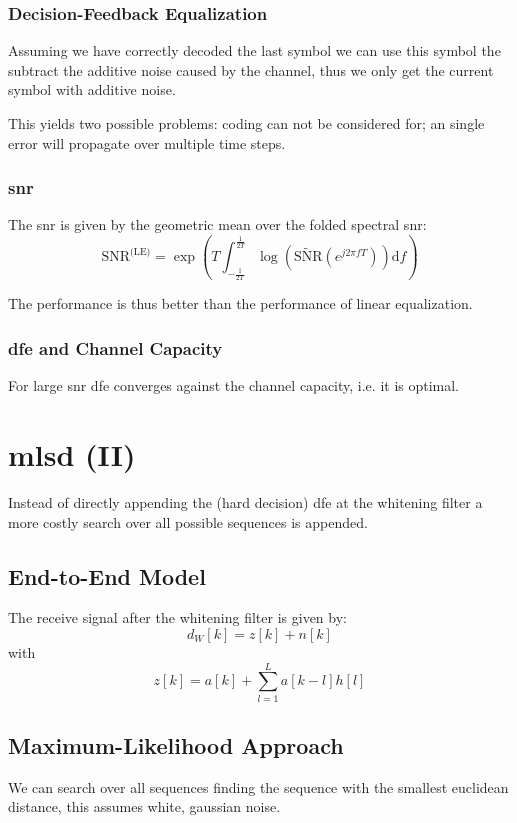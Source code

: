 \subsubsection{Decision-Feedback Equalization}
Assuming we have correctly decoded the last symbol we can use this symbol the subtract
the additive noise caused by the channel, thus we only get the current symbol with additive
noise.

This yields two possible problems: coding can not be considered for; an single error
will propagate over multiple time steps.

\subsubsection{\acl{snr}}
The \ac{snr} is given by the geometric mean over the folded spectral \ac{snr}:
\begin{equation}
    \text{SNR}^\text{(LE)} = \exp\left( T \int_{-\frac{1}{2T}}^\frac{1}{2T} \log \left(
        \tilde{\text{SNR}}(e^{j 2 \pi f T})\right) \text{d}f\right)
\end{equation}

The performance is thus better than the performance of linear equalization.

\subsubsection{\acl{dfe} and Channel Capacity}
For large \ac{snr} \ac{dfe} converges against the channel capacity, i.e. it is optimal.

\section{\acl{mlsd} (II)}
Instead of directly appending the (hard decision) \ac{dfe} at the whitening filter a more
costly search over all possible sequences is appended.

\subsection{End-to-End Model}
The receive signal after the whitening filter is given by:
\begin{equation}
    d_W[k] = z[k] + n[k]
\end{equation}
with
\begin{equation}
    z[k] = a[k] + \sum_{l=1}^L a[k-l]h[l]
\end{equation}

\subsection{Maximum-Likelihood Approach}
We can search over all sequences finding the sequence with the smallest euclidean distance,
this assumes white, gaussian noise.

